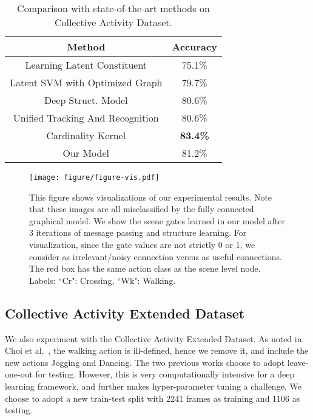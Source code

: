 \documentclass[10pt,twocolumn,letterpaper]{article}
\begin{document}
\begin{table}
\begin{tabular}{|c|c|}
\hline
Method & Accuracy \\
\hline
Learning Latent Constituent \cite{AnticO14} & 75.1\% \\
\hline
Latent SVM with Optimized Graph \cite{LanWYRM12} & 79.7\% \\
\hline
Deep Struct. Model \cite{DengZCLMRM15} & 80.6\% \\
\hline
Unified Tracking And Recognition\cite{choi_eccv12} & 80.6\% \\
\hline
Cardinality Kernel \cite{HajimirsadeghiMcvpr15} & \bf 83.4\% \\
\hline
Our Model & 81.2\%  \\
\hline
\end{tabular}
\caption{Comparison with state-of-the-art methods on Collective Activity Dataset.}
\label{sec:exp:cad_comp}
\vspace{-5mm}
\end{table}

\vspace{-1mm}

\begin{figure*}[t]
\begin{center}
  \texttt{[image: figure/figure-vis.pdf]}
\end{center}
\vspace{-5mm}
\caption{This figure shows visualizations of our experimental results. Note that these images are all misclassified by the fully connected graphical model. We show the scene gates learned in our model after 3 iterations of message passing and structure learning. For visualization, since the gate values are not strictly 0 or 1, we consider  as irrelevant/noisy connection versus  as useful connections. The red box has the same action class as the scene level node. Labels: ``Cr": Crossing, ``Wk": Walking.}
\label{fig:vis}
\vspace{-1mm}
\end{figure*}


\subsection{Collective Activity Extended Dataset}
We also experiment with the Collective Activity Extended Dataset. As noted in Choi et al.~\cite{Choi_CVPR_2011}, the walking action is ill-defined, hence we remove it, and include the  new actions Jogging and Dancing. 
The two previous works choose to adopt leave-one-out for testing. However, this is very computationally intensive for a  deep learning framework, and further makes hyper-parameter tuning a challenge. We choose to adopt a new train-test split with 2241 frames as training and 1106 as testing. 
\end{document}
